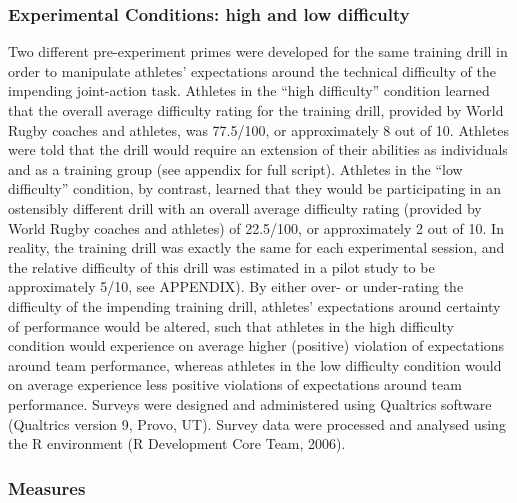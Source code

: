 \documentclass[english]{article}\usepackage[]{graphicx}\usepackage[]{color}
\begin{document}


\subsubsection{Experimental Conditions: high and low difficulty}
Two different pre-experiment primes were developed for the same training drill in order to manipulate athletes’ expectations around the technical difficulty of the impending joint-action task.  Athletes in the ``high difficulty'' condition learned that the overall average difficulty rating for the training drill, provided by World Rugby coaches and athletes, was 77.5/100, or approximately 8 out of 10.  Athletes were told that the drill would require an extension of their abilities as individuals and as a training group (see appendix for full script).  Athletes in the ``low difficulty'' condition, by contrast, learned that they would be participating in an ostensibly different drill with an overall average difficulty rating (provided by World Rugby coaches and athletes) of 22.5/100, or approximately 2 out of 10.  In reality, the training drill was exactly the same for each experimental session, and the relative difficulty of this drill was estimated in a pilot study to be approximately 5/10, see APPENDIX).  By either over- or under-rating the difficulty of the impending training drill, athletes' expectations around certainty of performance would be altered, such that athletes in the high difficulty condition would experience on average higher (positive) violation of expectations around team performance, whereas athletes in the low difficulty condition would on average experience less positive violations of expectations around team performance. Surveys were designed and administered using Qualtrics software (Qualtrics version 9, Provo, UT). Survey data were processed and analysed using the R environment (R Development Core Team, 2006).


\subsubsection{Measures}
\end{document}
